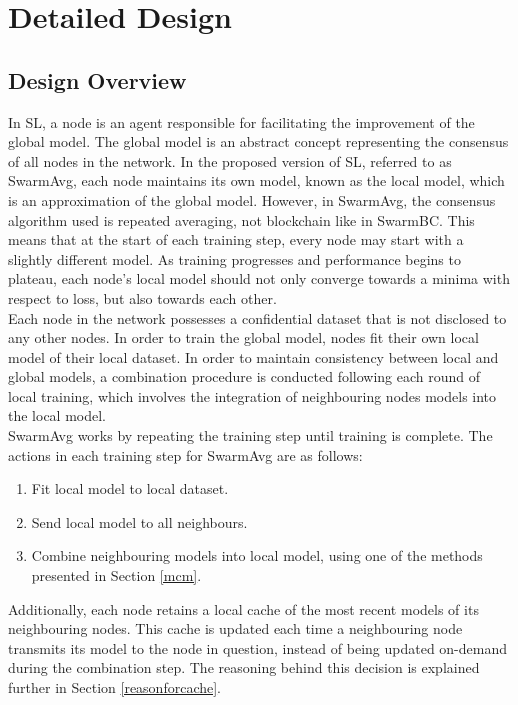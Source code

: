 \chapter{Detailed Design} \label{des}
\section{Design Overview}
In SL, a node is an agent responsible for facilitating the improvement of the global model. The global model is an abstract concept representing the consensus of all nodes in the network. In the proposed version of SL, referred to as SwarmAvg, each node maintains its own model, known as the local model, which is an approximation of the global model. However, in SwarmAvg, the consensus algorithm used is repeated averaging, not blockchain like in SwarmBC. This means that at the start of each training step, every node may start with a slightly different model. As training progresses and performance begins to plateau, each node's local model should not only converge towards a minima with respect to loss, but also towards each other. \\

Each node in the network possesses a confidential dataset that is not disclosed to any other nodes. In order to train the global model, nodes fit their own local model of their local dataset. In order to maintain consistency between local and global models, a combination procedure is conducted following each round of local training, which involves the integration of neighbouring nodes models into the local model. \\

SwarmAvg works by repeating the training step until training is complete. The actions in each training step for SwarmAvg are as follows:
\begin{enumerate}
	\item Fit local model to local dataset.
	\item Send local model to all neighbours.
	\item Combine neighbouring models into local model, using one of the methods presented in Section \ref{mcm}.
\end{enumerate}

Additionally, each node retains a local cache of the most recent models of its neighbouring nodes. This cache is updated each time a neighbouring node transmits its model to the node in question, instead of being updated on-demand during the combination step. The reasoning behind this decision is explained further in Section \ref{reasonforcache}.

